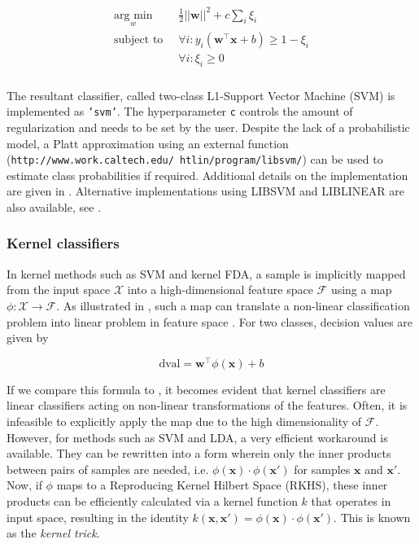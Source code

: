 \documentclass[utf8]{frontiersSCNS} %
\newcommand{\w}{\mathbf{w}}
\newcommand{\x}{\mathbf{x}}
\newcommand{\ttt}[1]{\texttt{#1}}
\begin{document}
\begin{align}
\begin{split}
\label{eq:svm_primal}
\underset{w}{\text{arg min}} &\ \frac{1}{2}||\w||^2 + c\sum_i \xi_i\\
\text{subject to } &\ \forall i: y_i (\w^\top\x + b) \ge 1 - \xi_i\\
&\ \forall i: \xi_i \ge 0\\
\end{split}
\end{align}

The resultant classifier, called two-class L1-Support Vector Machine (SVM) is implemented as \ttt{'svm'}. The hyperparameter \ttt{c} controls the amount of regularization and needs to be set by the user. Despite the lack of a probabilistic model, a Platt approximation using an external function (\ttt{http://www.work.caltech.edu/~htlin/program/libsvm/}) can be used to estimate class probabilities if required. Additional details on the implementation are given in . Alternative implementations using LIBSVM and LIBLINEAR are also available, see .

\subsubsection{Kernel classifiers}\label{sec:kernel-methods}

In kernel methods such as SVM and kernel FDA, a sample is implicitly mapped from the input space $\mathcal{X}$ into a high-dimensional feature space $\mathcal{F}$ using a map $\phi:\mathcal{X}\rightarrow\mathcal{F}$. As illustrated in , such a map can translate a non-linear classification problem into linear problem in feature space \citep{Scholkopf2001LearningBeyond}. For two classes, decision values are given by

\begin{equation}
\label{eq:kernel_dval}
\text{dval} = \w^\top\phi(\x) + b
\end{equation}

If we compare this formula to , it becomes evident that kernel classifiers are linear classifiers acting on non-linear transformations of the features. Often, it is  infeasible to explicitly apply the map due to the high dimensionality of $\mathcal{F}$.  However, for methods such as SVM and LDA, a very efficient workaround is available. They can be rewritten into a form wherein only the inner products between pairs of samples are needed, i.e. $\phi(\x)\cdot\phi(\x')$ for samples $\x$ and $\x'$. Now, if $\phi$ maps to a Reproducing Kernel Hilbert Space (RKHS), these inner products can be efficiently calculated via a kernel function $k$ that operates in input space, resulting in the identity $k(\x,\x') = \phi(\x)\cdot\phi(\x')$. This is known as the \textit{kernel trick}.
\end{document}
